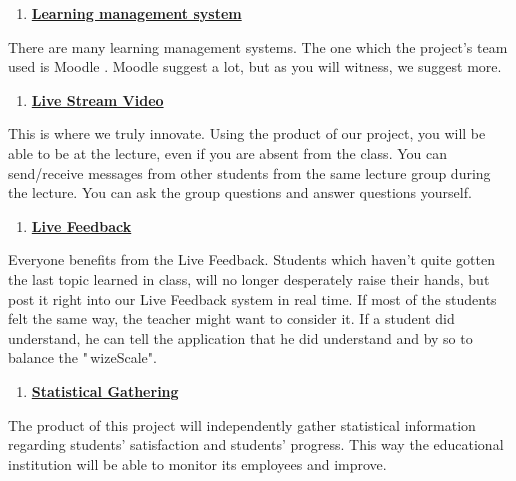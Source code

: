 \documentclass[12pt,a4paper]{article}
\begin{document}
    \begin{enumerate}
        \setcounter{enumi}{\thenumberedCntBD}
        \item \textbf{\underline{Learning management system}}
        \setcounter{numberedCntBD}{\theenumi}
    \end{enumerate}
    There are many learning management systems. The one which the project's
    team used is Moodle \cite{moodle,usingmoodle}. Moodle suggest a lot, but as you will witness, we suggest more.

    \begin{enumerate}
        \setcounter{enumi}{\thenumberedCntBD}
        \item \textbf{\underline{Live Stream Video}}
        \setcounter{numberedCntBD}{\theenumi}
    \end{enumerate}
    This is where we truly innovate. Using the product of our project, you
    will be able to be at the lecture, even if you are absent from the
    class. You can send/receive messages from other students from the same
    lecture group during the lecture. You can ask the group questions and
    answer questions yourself.



    \begin{enumerate}
        \setcounter{enumi}{\thenumberedCntBD}
        \item \textbf{\underline{Live Feedback}}
        \setcounter{numberedCntBD}{\theenumi}
    \end{enumerate}
    Everyone benefits from the Live Feedback. Students which haven't quite
    gotten the last topic learned in class, will no longer desperately raise
    their hands, but post it right into our Live Feedback system in real
    time. If most of the students felt the same way, the teacher might want
    to consider it. If a student did understand, he can tell the application
    that he did understand and by so to balance the "\,wizeScale".



    \begin{enumerate}
        \setcounter{enumi}{\thenumberedCntBD}
        \item \textbf{\underline{Statistical Gathering}}
        \setcounter{numberedCntBD}{\theenumi}
    \end{enumerate}
    The product of this project will independently gather statistical
    information regarding students' satisfaction and students' progress.
    This way the educational institution will be able to monitor its
    employees and improve.
\end{document}
